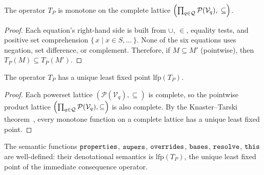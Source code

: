 \begin{lemma}[Monotonicity]\label{lem:monotonicity}
  The operator $T_P$ is monotone on the complete lattice
  $\Bigl(\prod_{q \in \mathcal{Q}} \mathcal{P}(\mathcal{V}_q),\; \subseteq\Bigr)$.
\end{lemma}

\begin{proof}
  Each equation's right-hand side is built from
  $\cup$, $\in$, equality tests, and positive set
  comprehension $\{\, x \mid x \in S, \ldots \,\}$.
  None of the six equations uses negation, set
  difference, or complement.
  Therefore, if $M \subseteq M'$ (pointwise), then
  $T_P(M) \subseteq T_P(M')$.
\end{proof}

\begin{theorem}\label{thm:lfp-exists}
  The operator $T_P$ has a unique least fixed point
  $\mathrm{lfp}(T_P)$.
\end{theorem}

\begin{proof}
  Each powerset lattice
  $(\mathcal{P}(\mathcal{V}_q), \subseteq)$
  is complete,
  so the pointwise product lattice
  $\Bigl(\prod_{q \in \mathcal{Q}} \mathcal{P}(\mathcal{V}_q), \subseteq\Bigr)$
  is also complete.
  By the Knaster--Tarski
  theorem~\cite{tarski1955-lattice-fixpoint-theorem},
  every monotone function on a complete lattice has a
  unique least fixed point.
\end{proof}

\begin{theorem}\label{thm:well-defined}
  The semantic functions
  $\mathtt{properties}$, $\mathtt{supers}$, $\mathtt{overrides}$, $\mathtt{bases}$,
  $\mathtt{resolve}$, $\mathtt{this}$ are well-defined:
  their denotational semantics is
  $\mathrm{lfp}(T_P)$, the unique least fixed point of
  the immediate consequence operator.
\end{theorem}

